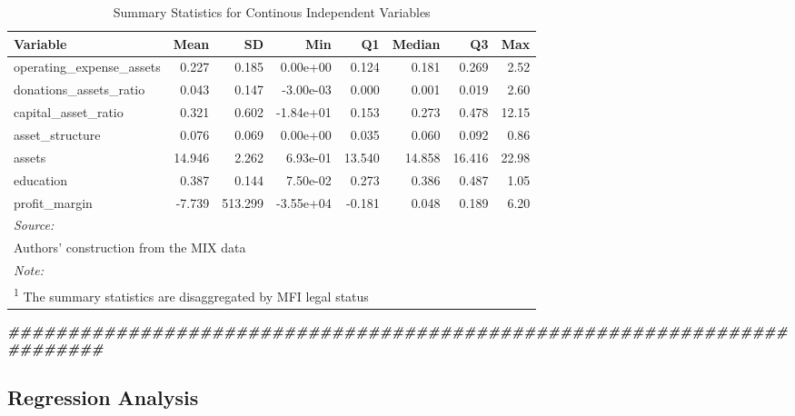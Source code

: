 \documentclass[a4paper,nobind]{templates/ociamthesis}
\newenvironment{Shaded}{\begin{snugshade}}{\end{snugshade}}
\newcommand{\DocumentationTok}[1]{\textcolor[rgb]{0.56,0.35,0.01}{\textbf{\textit{#1}}}}
\renewenvironment{Shaded}
{
  \vspace{10pt}%
  \begin{snugshade}%
}{%
  \end{snugshade}%
  \vspace{8pt}%
}
\begin{document}
\begin{table}

\caption{\label{tab:unnamed-chunk-21}Summary Statistics for Continous Independent Variables}
\centering
\fontsize{10}{12}\selectfont
\begin{tabular}[t]{lrrrrrrr}
\toprule
Variable & Mean & SD & Min & Q1 & Median & Q3 & Max\\
\midrule
operating\_expense\_assets & 0.227 & 0.185 & 0.00e+00 & 0.124 & 0.181 & 0.269 & 2.52\\
donations\_assets\_ratio & 0.043 & 0.147 & -3.00e-03 & 0.000 & 0.001 & 0.019 & 2.60\\
capital\_asset\_ratio & 0.321 & 0.602 & -1.84e+01 & 0.153 & 0.273 & 0.478 & 12.15\\
asset\_structure & 0.076 & 0.069 & 0.00e+00 & 0.035 & 0.060 & 0.092 & 0.86\\
assets & 14.946 & 2.262 & 6.93e-01 & 13.540 & 14.858 & 16.416 & 22.98\\
\addlinespace
education & 0.387 & 0.144 & 7.50e-02 & 0.273 & 0.386 & 0.487 & 1.05\\
profit\_margin & -7.739 & 513.299 & -3.55e+04 & -0.181 & 0.048 & 0.189 & 6.20\\
\bottomrule
\multicolumn{8}{l}{\rule{0pt}{1em}\textit{Source: }}\\
\multicolumn{8}{l}{\rule{0pt}{1em}Authors' construction from the MIX data}\\
\multicolumn{8}{l}{\rule{0pt}{1em}\textit{Note: }}\\
\multicolumn{8}{l}{\rule{0pt}{1em}\textsuperscript{1} The summary statistics are disaggregated by MFI legal status}\\
\end{tabular}
\end{table}

\begin{Shaded}
\begin{Highlighting}[]
\DocumentationTok{\#\#\#\#\#\#\#\#\#\#\#\#\#\#\#\#\#\#\#\#\#\#\#\#\#\#\#\#\#\#\#\#\#\#\#\#\#\#\#\#\#\#\#\#\#\#\#\#\#\#\#\#\#\#\#\#\#\#\#\#\#\#\#\#\#\#\#\#\#\#\#\#\#}
\end{Highlighting}
\end{Shaded}

\newpage

\hypertarget{regression-analysis}{%
\subsection{\texorpdfstring{\textbf{Regression Analysis}}{Regression Analysis}}\label{regression-analysis}}
\end{document}
